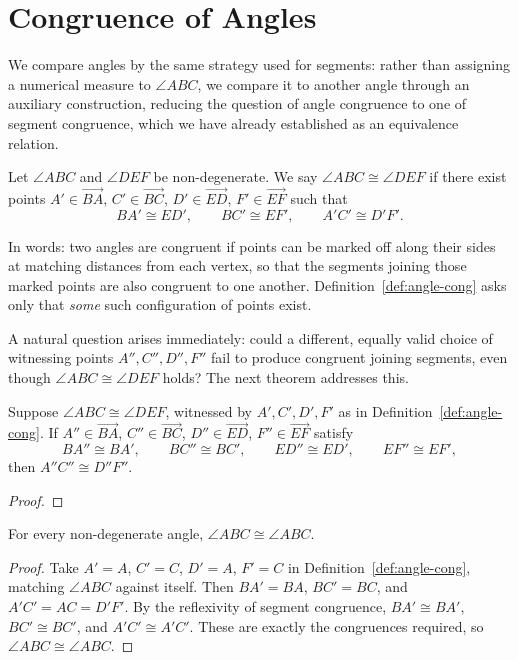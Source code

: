 \documentclass[../../../main/main.tex]{subfiles}
\begin{document}
\section{Congruence of Angles}

We compare angles by the same strategy used for segments: rather than assigning a numerical measure to $\angle ABC$, we compare it to another angle through an auxiliary construction, reducing the question of angle congruence to one of segment congruence, which we have already established as an equivalence relation.

\begin{definition}\label{def:angle-cong}
Let $\angle ABC$ and $\angle DEF$ be non-degenerate. We say $\angle ABC \cong \angle DEF$ if there exist points $A' \in \overrightarrow{BA}$, $C' \in \overrightarrow{BC}$, $D' \in \overrightarrow{ED}$, $F' \in \overrightarrow{EF}$ such that
\[
BA' \cong ED', \qquad BC' \cong EF', \qquad A'C' \cong D'F'.
\]
\end{definition}

In words: two angles are congruent if points can be marked off along their sides at matching distances from each vertex, so that the segments joining those marked points are also congruent to one another. Definition~\ref{def:angle-cong} asks only that \emph{some} such configuration of points exist.

A natural question arises immediately: could a different, equally valid choice of witnessing points $A'', C'', D'', F''$ fail to produce congruent joining segments, even though $\angle ABC \cong \angle DEF$ holds? The next theorem addresses this.

\begin{theorem}\label{thm:angle-cong-well-defined}
Suppose $\angle ABC \cong \angle DEF$, witnessed by $A', C', D', F'$ as in Definition~\ref{def:angle-cong}. If $A'' \in \overrightarrow{BA}$, $C'' \in \overrightarrow{BC}$, $D'' \in \overrightarrow{ED}$, $F'' \in \overrightarrow{EF}$ satisfy
\[
BA'' \cong BA', \qquad BC'' \cong BC', \qquad ED'' \cong ED', \qquad EF'' \cong EF',
\]
then $A''C'' \cong D''F''$.
\end{theorem}
\begin{proof}

\end{proof}

\begin{theorem}\label{thm:angle-cong-reflex}
For every non-degenerate angle, $\angle ABC \cong \angle ABC$.
\end{theorem}
\begin{proof}
Take $A' = A$, $C' = C$, $D' = A$, $F' = C$ in Definition~\ref{def:angle-cong}, matching $\angle ABC$ against itself. Then $BA' = BA$, $BC' = BC$, and $A'C' = AC = D'F'$. By the reflexivity of segment congruence, $BA' \cong BA'$, $BC' \cong BC'$, and $A'C' \cong A'C'$. These are exactly the congruences required, so $\angle ABC \cong \angle ABC$.
\end{proof}
\end{document}

